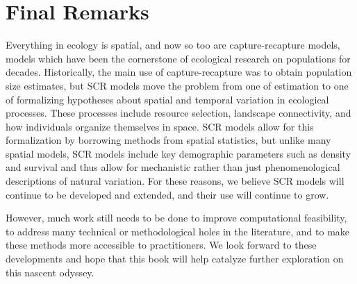 \section{Final Remarks}

Everything in ecology is spatial, and now so too are capture-recapture
models, models which have been the cornerstone of ecological research
on populations for decades.  Historically, the main use of
capture-recapture was to obtain population size estimates, but SCR
models move the problem from one of estimation to one of formalizing
hypotheses about spatial and temporal variation in ecological
processes.
These processes include resource selection, landscape connectivity, and
how individuals organize themselves in space. SCR models allow for
this formalization by borrowing methods from spatial statistics,
but unlike many spatial models, SCR models include key demographic
parameters such as density and survival and thus allow for mechanistic
rather than just phenomenological descriptions of natural variation.
For these reasons, we believe SCR models will continue to be developed
and extended, and their use will continue to grow.

However, much work still needs to be done to improve computational
feasibility, to address many technical or methodological holes in the
literature, and to make these methods more accessible to
practitioners.  We look forward to these developments and hope that
this book will help catalyze further exploration on this nascent
odyssey.













